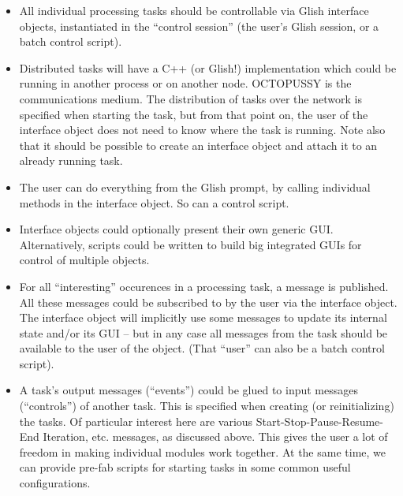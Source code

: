 \documentclass[12pt]{article}
\begin{document}
  \begin{itemize}
  
  \item All individual processing tasks should be controllable via Glish
  interface objects, instantiated in the ``control session'' (the user's Glish
  session, or a batch control script).

  \item Distributed tasks will have a C++ (or Glish!) implementation which
  could be running in another process or on another node. OCTOPUSSY is the
  communications medium. The distribution of tasks over the network is
  specified when starting the task, but from that point on, the user of the
  interface object does not need to know where the task is running. Note also
  that it should be possible to create an interface object and attach it to an
  already running task.

  \item The user can do everything from the Glish prompt, by calling individual
  methods in the interface object. So can a control script.

  \item Interface objects could optionally present their own generic GUI. 
  Alternatively, scripts could be written to build big integrated GUIs for
  control of multiple objects. 

  \item For all ``interesting'' occurences in a processing task, a message is
  published. All these messages could be subscribed to by the user via the
  interface object. The interface object will implicitly use some messages to
  update its internal state and/or its GUI -- but in any case all messages from
  the task should be available to the user of the object. (That ``user'' can
  also be a batch control script). 

  \item A task's output messages (``events'') could be glued to input messages
  (``controls'') of another task. This is specified when creating (or
  reinitializing) the tasks. Of particular interest here are various
  Start-Stop-Pause-Resume-End Iteration, etc. messages, as discussed above.
  This gives the user a lot of freedom in making individual modules work
  together. At the same time, we can provide pre-fab scripts for starting tasks
  in some common useful configurations.

  \end{itemize}
\end{document}
